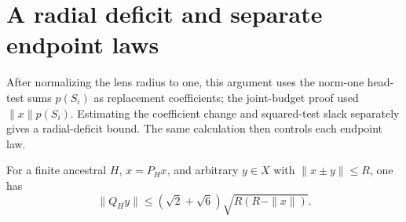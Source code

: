 \section{A radial deficit and separate endpoint laws}\label{sec:radial}
After normalizing the lens radius to one, this argument uses the
norm-one head-test sums $p(S_i)$ as replacement coefficients; the
joint-budget proof used $\|x\|p(S_i)$. Estimating the coefficient
change and squared-test slack separately gives a radial-deficit bound.
The same calculation then controls each endpoint law.

\begin{proposition}\label{thm:tail}
For a finite ancestral $H$, $x=P_Hx$, and arbitrary $y\in X$ with
$\|x\pm y\|\le R$, one has
\begin{equation}\label{eq:atomic-tail}
 \|Q_Hy\|\le(\sqrt2+\sqrt6)\sqrt{R(R-\|x\|)}.
\end{equation}
\end{proposition}

